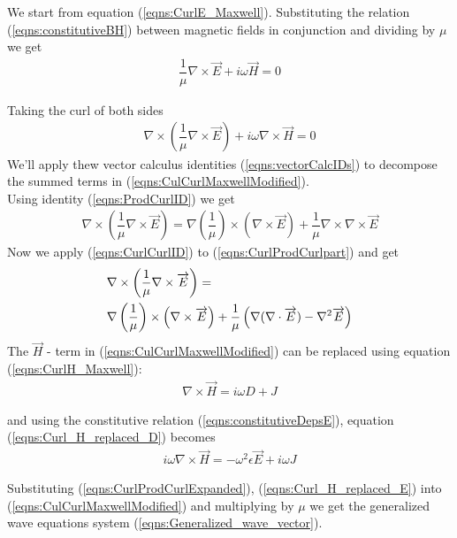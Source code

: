 \documentclass[twocolumn,secnumarabic,amssymb, nobibnotes, aps, prd]{revtex4-1}
\begin{document}
We start from equation (\ref{eqns:CurlE_Maxwell}). Substituting the relation (\ref{eqns:constitutiveBH}) between magnetic fields in conjunction and dividing by $\mu$ we get
\begin{align*}
\dfrac{1}{\mu} \nabla \times \overrightarrow{E} + i \omega \overrightarrow{H} = 0
\end{align*}

Taking the curl of both sides 
\begin{align}
\label{eqns:CulCurlMaxwellModified}
\nabla \times \left( \dfrac{1}{\mu} \nabla \times \overrightarrow{E} \right)  + i \omega \nabla \times  \overrightarrow{H} = 0
\end{align}
We'll apply thew vector calculus identities (\ref{eqns:vectorCalcIDs}) to decompose the summed terms in (\ref{eqns:CulCurlMaxwellModified}).\\
Using identity (\ref{eqns:ProdCurlID}) we get
\begin{align}
\label{eqns:CurlProdCurlpart}
\nabla \times \left( \dfrac{1}{\mu} \nabla \times \overrightarrow{E} \right) = \nabla \left( \dfrac{1}{\mu} \right) \times \left(\nabla \times \overrightarrow{E} \right) + \dfrac{1}{\mu} \nabla \times \nabla \times \overrightarrow{E}
\end{align}
Now we apply (\ref{eqns:CurlCurlID}) to (\ref{eqns:CurlProdCurlpart}) and get
\begin{align}
\label{eqns:CurlProdCurlExpanded}
&\nabla \times \left( \dfrac{1}{\mu} \nabla  \times \overrightarrow{E} \right) = \notag \\
&\nabla \left( \dfrac{1}{\mu} \right) \times \left(\nabla \times  \overrightarrow{E} \right) + \dfrac{1}{\mu} \left( \nabla (\nabla \cdot \overrightarrow{E}) - \nabla^2 \overrightarrow{E}\right)
\end{align}
The $\overrightarrow{H}$ - term in (\ref{eqns:CulCurlMaxwellModified}) can be replaced using equation (\ref{eqns:CurlH_Maxwell}):
\begin{align}
\label{eqns:Curl_H_replaced_D}
\nabla \times \overrightarrow{H} = i \omega D  + J
\end{align}

and using the constitutive relation (\ref{eqns:constitutiveDepsE}), equation (\ref{eqns:Curl_H_replaced_D}) becomes
\begin{align}
\label{eqns:Curl_H_replaced_E}
i \omega  \nabla \times \overrightarrow{H} = -\omega^2 \epsilon \overrightarrow{E} + i \omega J
\end{align}

Substituting (\ref{eqns:CurlProdCurlExpanded}), (\ref{eqns:Curl_H_replaced_E}) into (\ref{eqns:CulCurlMaxwellModified}) and multiplying by  $\mu$ we get the generalized wave equations system (\ref{eqns:Generalized_wave_vector}). 
\end{document}
